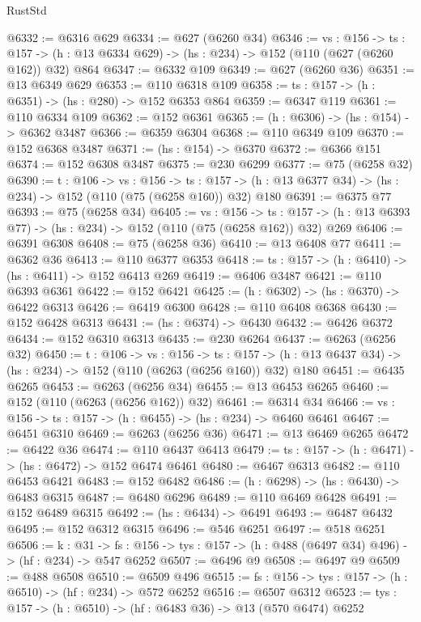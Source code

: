 \begin{lexlean}{RustStd}
\begin{coremodule}
@6332 := @6316 @629
@6334 := @627 (@6260 @34)
@6346 := {vs : @156} ->
  {ts : @157} -> (h : @13 @6334 @629) -> (hs : @234) -> @152 (@110 (@627 (@6260 @162)) @32) @864
@6347 := @6332 @109
@6349 := @627 (@6260 @36)
@6351 := @13 @6349 @629
@6353 := @110 @6318 @109
@6358 := {ts : @157} -> (h : @6351) -> (hs : @280) -> @152 @6353 @864
@6359 := @6347 @119
@6361 := @110 @6334 @109
@6362 := @152 @6361
@6365 := (h : @6306) -> (hs : @154) -> @6362 @3487
@6366 := @6359 @6304
@6368 := @110 @6349 @109
@6370 := @152 @6368 @3487
@6371 := (hs : @154) -> @6370
@6372 := @6366 @151
@6374 := @152 @6308 @3487
@6375 := @230 @6299
@6377 := @75 (@6258 @32)
@6390 := {t : @106} ->
  {vs : @156} ->
  {ts : @157} -> (h : @13 @6377 @34) -> (hs : @234) -> @152 (@110 (@75 (@6258 @160)) @32) @180
@6391 := @6375 @77
@6393 := @75 (@6258 @34)
@6405 := {vs : @156} ->
  {ts : @157} -> (h : @13 @6393 @77) -> (hs : @234) -> @152 (@110 (@75 (@6258 @162)) @32) @269
@6406 := @6391 @6308
@6408 := @75 (@6258 @36)
@6410 := @13 @6408 @77
@6411 := @6362 @36
@6413 := @110 @6377 @6353
@6418 := {ts : @157} -> (h : @6410) -> (hs : @6411) -> @152 @6413 @269
@6419 := @6406 @3487
@6421 := @110 @6393 @6361
@6422 := @152 @6421
@6425 := (h : @6302) -> (hs : @6370) -> @6422 @6313
@6426 := @6419 @6300
@6428 := @110 @6408 @6368
@6430 := @152 @6428 @6313
@6431 := (hs : @6374) -> @6430
@6432 := @6426 @6372
@6434 := @152 @6310 @6313
@6435 := @230 @6264
@6437 := @6263 (@6256 @32)
@6450 := {t : @106} ->
  {vs : @156} ->
  {ts : @157} -> (h : @13 @6437 @34) -> (hs : @234) -> @152 (@110 (@6263 (@6256 @160)) @32) @180
@6451 := @6435 @6265
@6453 := @6263 (@6256 @34)
@6455 := @13 @6453 @6265
@6460 := @152 (@110 (@6263 (@6256 @162)) @32)
@6461 := @6314 @34
@6466 := {vs : @156} -> {ts : @157} -> (h : @6455) -> (hs : @234) -> @6460 @6461
@6467 := @6451 @6310
@6469 := @6263 (@6256 @36)
@6471 := @13 @6469 @6265
@6472 := @6422 @36
@6474 := @110 @6437 @6413
@6479 := {ts : @157} -> (h : @6471) -> (hs : @6472) -> @152 @6474 @6461
@6480 := @6467 @6313
@6482 := @110 @6453 @6421
@6483 := @152 @6482
@6486 := (h : @6298) -> (hs : @6430) -> @6483 @6315
@6487 := @6480 @6296
@6489 := @110 @6469 @6428
@6491 := @152 @6489 @6315
@6492 := (hs : @6434) -> @6491
@6493 := @6487 @6432
@6495 := @152 @6312 @6315
@6496 := @546 @6251
@6497 := @518 @6251
@6506 := {k : @31} ->
  {fs : @156} -> {tys : @157} -> (h : @488 (@6497 @34) @496) -> (hf : @234) -> @547 @6252
@6507 := @6496 @9
@6508 := @6497 @9
@6509 := @488 @6508
@6510 := @6509 @496
@6515 := {fs : @156} -> {tys : @157} -> (h : @6510) -> (hf : @234) -> @572 @6252
@6516 := @6507 @6312
@6523 := {tys : @157} -> (h : @6510) -> (hf : @6483 @36) -> @13 (@570 @6474) @6252

\end{coremodule}
\end{lexlean}
